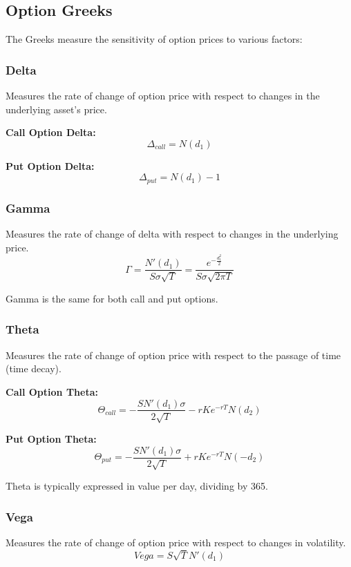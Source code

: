 \documentclass{article}
\begin{document}
\subsection{Option Greeks}
The Greeks measure the sensitivity of option prices to various factors:

\subsubsection{Delta}
Measures the rate of change of option price with respect to changes in the underlying asset's price.

\textbf{Call Option Delta:}
\begin{equation}
\Delta_{call} = N(d_1)
\end{equation}

\textbf{Put Option Delta:}
\begin{equation}
\Delta_{put} = N(d_1) - 1
\end{equation}

\subsubsection{Gamma}
Measures the rate of change of delta with respect to changes in the underlying price.
\begin{equation}
\Gamma = \frac{N'(d_1)}{S\sigma\sqrt{T}} = \frac{e^{-\frac{d_1^2}{2}}}{S\sigma\sqrt{2\pi T}}
\end{equation}

Gamma is the same for both call and put options.

\subsubsection{Theta}
Measures the rate of change of option price with respect to the passage of time (time decay).

\textbf{Call Option Theta:}
\begin{equation}
\Theta_{call} = -\frac{S N'(d_1)\sigma}{2\sqrt{T}} - rKe^{-rT}N(d_2)
\end{equation}

\textbf{Put Option Theta:}
\begin{equation}
\Theta_{put} = -\frac{S N'(d_1)\sigma}{2\sqrt{T}} + rKe^{-rT}N(-d_2)
\end{equation}

Theta is typically expressed in value per day, dividing by 365.

\subsubsection{Vega}
Measures the rate of change of option price with respect to changes in volatility.
\begin{equation}
Vega = S\sqrt{T}N'(d_1)
\end{equation}
\end{document}

